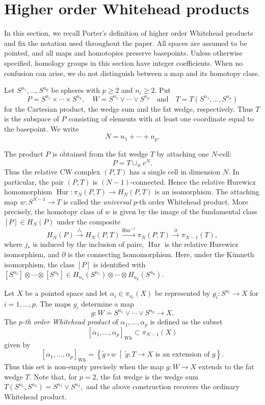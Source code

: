 \documentclass[a4paper,10pt]{amsart}
\theoremstyle{definition}
\theoremstyle{remark}
\numberwithin{equation}{section}
\begin{document}
\section{Higher order Whitehead products}

In this section, we recall Porter's definition of higher order Whitehead products
and fix the notation used throughout the paper. All spaces are assumed to be
pointed, and all maps and homotopies preserve basepoints. Unless otherwise
specified, homology groups in this section have integer coefficients. When no
confusion can arise, we do not distinguish between a map and its homotopy class.

Let $S^{n_1}, \ldots, S^{n_p}$ be spheres with $p\geq2$ and $n_i\geq 2$.
Put
\[
P=S^{n_1}\times\cdots\times S^{n_p},
\quad
W=S^{n_1}\vee\cdots\vee S^{n_p}
\quad
\text{and}
\quad
T=T(S^{n_1},\ldots,S^{n_p})
\]
for the Cartesian product, the wedge sum and the fat wedge, respectively.
Thus $T$ is the subspace of $P$ consisting of elements with at least one
coordinate equal to the basepoint. We write
\[
N=n_1+\cdots+n_p.
\]

The product $P$ is obtained from the fat wedge $T$ by attaching one
$N$-cell:
\[
P=T\cup_w e^N.
\]
Thus the relative CW complex $(P,T)$ has a single cell in dimension $N$.
In particular, the pair $(P,T)$ is $(N-1)$-connected.
Hence the relative Hurewicz homomorphism $\operatorname{Hur} : \pi_N(P,T) \to H_N(P,T)$ is an isomorphism.
The attaching map
$
w:S^{N-1} \to T
$
is called the \emph{universal} $p$-th order Whitehead product. More precisely, the
homotopy class of $w$ is given by the image of the fundamental class
$
[P]\in H_N(P)
$
under the composite
\begin{equation}\label{eq:universal-HOP}
H_N(P)
\xrightarrow{j_*}
H_N(P,T)
\xrightarrow{\operatorname{Hur}^{-1}}
\pi_N(P,T)
\xrightarrow{\partial}
\pi_{N-1}(T),
\end{equation}
where $j_*$ is induced by the inclusion of pairs, $\operatorname{Hur}$ is the
relative Hurewicz isomorphism, and $\partial$ is the connecting homomorphism.
Here, under the K{\"u}nneth isomorphism, the class $[P]$ is identified with
$
[S^{n_1}]\otimes\cdots\otimes[S^{n_p}]
\in
H_{n_1}(S^{n_1})\otimes \cdots \otimes H_{n_p}(S^{n_p}).
$

Let $X$ be a pointed space and let
$
\alpha_i\in \pi_{n_i}(X)
$
be represented by $g_i:S^{n_i}\to X$ for $i=1,\ldots,p$.
The maps $g_i$ determine a map
\[
g:W=S^{n_1}\vee\cdots\vee S^{n_p}
\longrightarrow X.
\]
The \emph{$p$-th order Whitehead product} of
$\alpha_1,\ldots,\alpha_p$ is defined as the subset
\[
[\alpha_1,\ldots,\alpha_p]_{\mathrm{Wh}}
\subset
\pi_{N-1}(X)
\]
given by
\[
[\alpha_1,\ldots,\alpha_p]_{\mathrm{Wh}}
=
\left\{
\widetilde g\circ w
\ \middle|\
\widetilde g:T\to X
\text{ is an extension of }g
\right\}.
\]
Thus this set is non-empty precisely when the map $g:W\to X$ extends to the
fat wedge $T$. Note that, for $p=2$, the fat wedge is the wedge sum
$
T(S^{n_1},S^{n_2})=S^{n_1}\vee S^{n_2},
$
and the above construction recovers the ordinary Whitehead product.
\end{document}
